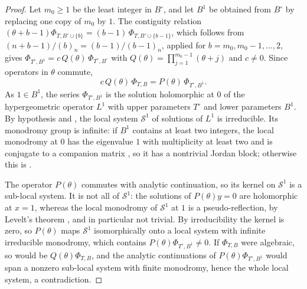 \documentclass[11pt]{amsart}
\theoremstyle{definition}
\theoremstyle{remark}
\numberwithin{equation}{section}
\newcommand{\cS}{\mathcal{S}}
\begin{document}
\begin{proof}
Let $m_0\ge1$ be the least integer in $B^\circ$, and let $B^1$ be obtained from $B^\circ$ by replacing one copy of $m_0$ by $1$. The contiguity relation $(\theta+b-1)\Phi_{T,B'\cup\{b\}}=(b-1)\,\Phi_{T,B'\cup\{b-1\}}$, which follows from $(n+b-1)/(b)_n=(b-1)/(b-1)_n$, applied for $b=m_0,m_0-1,\dots,2$, gives $\Phi_{T^\circ,B^1}=c\,Q(\theta)\,\Phi_{T^\circ,B^\circ}$ with $Q(\theta)=\prod_{j=1}^{m_0-1}(\theta+j)$ and $c\ne0$. Since operators in $\theta$ commute,
\[
c\,Q(\theta)\,\Phi_{T,B}=P(\theta)\,\Phi_{T^\circ,B^1}.
\]
As $1\in B^1$, the series $\Phi_{T^\circ,B^1}$ is the solution holomorphic at $0$ of the hypergeometric operator $L^1$ with upper parameters $T^\circ$ and lower parameters $B^1$. By hypothesis and \citet[Proposition~3.3]{BeukersHeckman1989}, the local system $\cS^1$ of solutions of $L^1$ is irreducible. Its monodromy group is infinite: if $B^1$ contains at least two integers, the local monodromy at $0$ has the eigenvalue $1$ with multiplicity at least two and is conjugate to a companion matrix \citep[Theorem~3.5]{BeukersHeckman1989}, so it has a nontrivial Jordan block; otherwise this is \citet[Theorem~4.8]{BeukersHeckman1989}.

The operator $P(\theta)$ commutes with analytic continuation, so its kernel on $\cS^1$ is a sub-local system. It is not all of $\cS^1$: the solutions of $P(\theta)y=0$ are holomorphic at $x=1$, whereas the local monodromy of $\cS^1$ at $1$ is a pseudo-reflection, by Levelt's theorem \citep[Theorem~3.5]{BeukersHeckman1989}, and in particular not trivial. By irreducibility the kernel is zero, so $P(\theta)$ maps $\cS^1$ isomorphically onto a local system with infinite irreducible monodromy, which contains $P(\theta)\Phi_{T^\circ,B^1}\ne0$. If $\Phi_{T,B}$ were algebraic, so would be $Q(\theta)\Phi_{T,B}$, and the analytic continuations of $P(\theta)\Phi_{T^\circ,B^1}$ would span a nonzero sub-local system with finite monodromy, hence the whole local system, a contradiction.
\end{proof}
\end{document}
